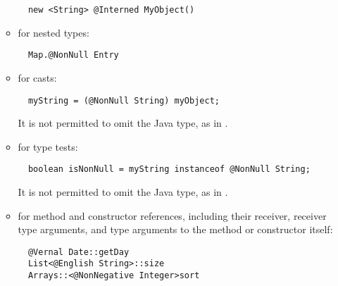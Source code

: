 \documentclass[10pt]{article}
\newcommand{\preverbnegspace}{\vspace{-5pt}}
\begin{document}
\begin{enumerate}
\begin{itemize}
\preverbnegspace
\begin{Verbatim}
  new <String> @Interned MyObject()
\end{Verbatim}

\item for nested types:
\preverbnegspace
\begin{Verbatim}
  Map.@NonNull Entry
\end{Verbatim}

\item for casts:
\preverbnegspace
\begin{Verbatim}
  myString = (@NonNull String) myObject;
\end{Verbatim}
\preverbnegspace
It is not permitted to omit the Java type, as in
.

\item for type tests:
\preverbnegspace
\begin{Verbatim}
  boolean isNonNull = myString instanceof @NonNull String;
\end{Verbatim}
\preverbnegspace
It is not permitted to omit the Java type, as in
.

\item for method and constructor references, including their receiver,
  receiver type arguments, and type arguments to the method or constructor
  itself:
\preverbnegspace
\begin{Verbatim}
  @Vernal Date::getDay
  List<@English String>::size
  Arrays::<@NonNegative Integer>sort
\end{Verbatim}



\end{itemize}


\end{enumerate}
\end{document}
